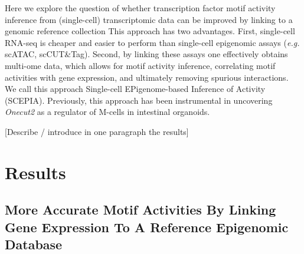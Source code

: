 Here we explore the question of whether transcription factor motif activity inference from (single-cell) transcriptomic data can be improved by linking to a genomic reference collection This approach has two advantages. First, single-cell RNA-seq is cheaper and easier to perform than single-cell epigenomic assays (\textit{e.g.} scATAC, scCUT\&Tag). Second, by linking these assays one effectively obtains multi-ome data, which allows for motif activity inference, correlating motif activities with gene expression, and ultimately removing spurious interactions. We call this approach Single-cell EPigenome-based Inference of Activity (SCEPIA). Previously, this approach has been instrumental in uncovering \textit{Onecut2} as a regulator of M-cells in intestinal organoids\cite{LunaVelez2023}. 

[Describe / introduce in one paragraph the results]

\section{Results}

\subsection{More Accurate Motif Activities By Linking Gene Expression To A Reference Epigenomic Database}

